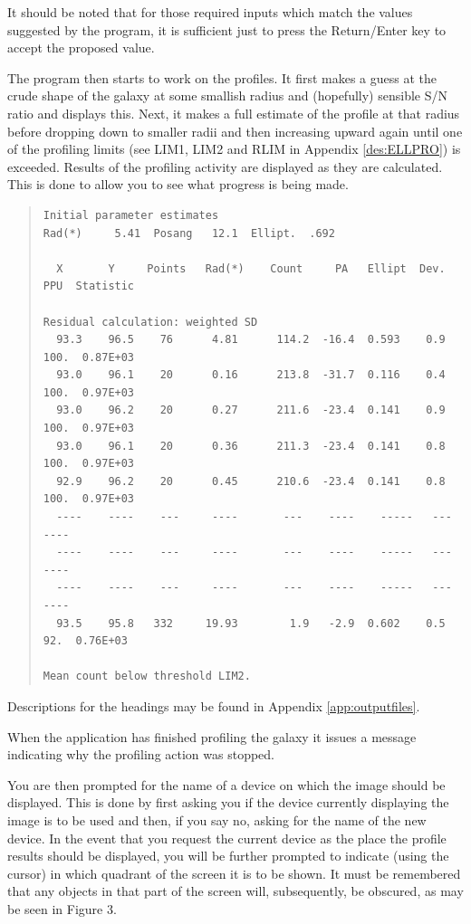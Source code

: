 \documentclass[twoside,11pt]{article}
\newenvironment{myquote}{\begin{quote}\begin{small}}{\end{small}\end{quote}}
\begin{document}
It should be noted that for those required inputs which match the 
values suggested by the program, it is sufficient just to press
the Return/Enter key to accept the proposed value.

The program then starts to work on the profiles. It first makes a guess at 
the crude shape of the galaxy at some smallish radius and (hopefully) 
sensible S/N ratio and displays this.
Next, it makes a full estimate of the profile at that radius before dropping
down to smaller radii and then increasing upward again until
one of the profiling limits (see LIM1, LIM2 and RLIM in Appendix 
\ref{des:ELLPRO})
is exceeded. Results of the
profiling activity are displayed as they are calculated. This is done to allow
you to see what progress is being made.

\begin{myquote}
\begin{verbatim}
Initial parameter estimates
Rad(*)     5.41  Posang   12.1  Ellipt.  .692

  X       Y     Points   Rad(*)    Count     PA   Ellipt  Dev.  PPU  Statistic

Residual calculation: weighted SD
  93.3    96.5    76      4.81      114.2  -16.4  0.593    0.9  100.  0.87E+03
  93.0    96.1    20      0.16      213.8  -31.7  0.116    0.4  100.  0.97E+03
  93.0    96.2    20      0.27      211.6  -23.4  0.141    0.9  100.  0.97E+03
  93.0    96.1    20      0.36      211.3  -23.4  0.141    0.8  100.  0.97E+03
  92.9    96.2    20      0.45      210.6  -23.4  0.141    0.8  100.  0.97E+03
  ----    ----    ---     ----       ---    ----    -----   ---    ----
  ----    ----    ---     ----       ---    ----    -----   ---    ----
  ----    ----    ---     ----       ---    ----    -----   ---    ----
  93.5    95.8   332     19.93        1.9   -2.9  0.602    0.5   92.  0.76E+03
 
Mean count below threshold LIM2.
\end{verbatim}
\end{myquote}

Descriptions for the headings may be found in Appendix \ref{app:outputfiles}.

When the application has finished profiling the galaxy it issues a message
indicating why the profiling action was stopped.

You are then prompted for the name of a device on which the image should be
displayed. This is done by first asking you if the device currently displaying
the image is to be used
and then, if you say no, asking for the name of the new device. In the event
that you request the current device as the place the profile results should be
displayed, you will be further prompted to indicate (using the cursor) in which
quadrant of the
screen it is to be shown. It must be remembered that any objects in that part
of the screen will, subsequently, be obscured, as may be seen in Figure 3.
\end{document}
